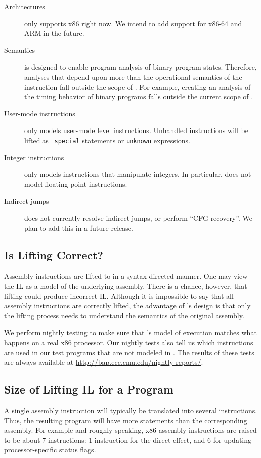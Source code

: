 \begin{description}
\item[Architectures] \bap only supports x86 right now.  We intend to
  add support for x86-64 and ARM in the future.
\item[Semantics] \bap is designed to enable program analysis of binary
  program states. Therefore, analyses that depend upon more than the
  operational semantics of the instruction fall outside the scope of
  \bap. For example, creating an analysis of the timing behavior of
  binary programs falls outside the current scope of \bap.
\item[User-mode instructions] \bap only models user-mode level
  instructions.  Unhandled instructions will be lifted as {\tt
    special} statements or {\tt unknown} expressions.
\item[Integer instructions] \bap only models instructions that
  manipulate integers.  In particular, \bap does not model floating
  point instructions.
\item[Indirect jumps] \bap does not currently resolve indirect jumps,
  or perform ``CFG recovery''.  We plan to add this in a future
  release.
\end{description}

\subsection{Is Lifting Correct?}

Assembly instructions are lifted to \bap in a syntax directed manner.
One may view the \bap IL as a model of the underlying assembly.  There
is a chance, however, that lifting could produce incorrect
IL. Although it is impossible to say that all assembly instructions
are correctly lifted, the advantage of \bap's design is that only the
lifting process needs to understand the semantics of the original
assembly.

We perform nightly testing to make sure that \bap's model of execution
matches what happens on a real x86 processor.  Our nightly tests also
tell us which instructions are used in our test programs that are not
modeled in \bap.  The results of these tests are always available at
\url{http://bap.ece.cmu.edu/nightly-reports/}.

\subsection{Size of Lifting IL for a Program}

A single assembly instruction will typically be translated into
several \bap instructions. Thus, the resulting \bap program will
have more statements than the corresponding assembly.  For example and
roughly speaking, x86 assembly instructions are raised to be about 7
\bap instructions: 1 \bap instruction for the direct effect, and 6
for updating processor-specific status flags.

